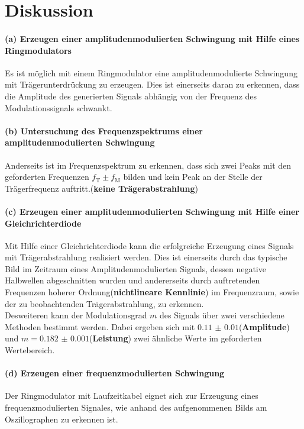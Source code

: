\FloatBarrier
\section{Diskussion}
\label{sec:Diskussion}


\paragraph{(a) Erzeugen einer amplitudenmodulierten Schwingung mit
Hilfe eines Ringmodulators}
Es ist möglich mit einem Ringmodulator
eine amplitudenmodulierte Schwingung
mit Trägerunterdrückung zu erzeugen.
Dies ist einerseits daran zu erkennen,
dass die Amplitude des generierten Signals abhängig
von der Frequenz des Modulationssignals schwankt.

\paragraph{(b) Untersuchung des Frequenzspektrums einer
amplitudenmodulierten Schwingung}
Anderseits ist im Frequenzspektrum zu erkennen, dass sich zwei
Peaks mit den geforderten Frequenzen $f_{\text{T}}\pm f_{\text{M}}$
bilden
und kein Peak an der Stelle der Trägerfrequenz
auftritt.(\textbf{keine Trägerabstrahlung})

\paragraph{(c) Erzeugen einer amplitudenmodulierten Schwingung
mit Hilfe einer Gleichrichterdiode}
Mit Hilfe einer Gleichrichterdiode kann
die erfolgreiche Erzeugung eines Signals mit Trägerabstrahlung
realisiert werden.
Dies ist einerseits durch das typische Bild im Zeitraum eines
Amplitudenmodulierten Signals, dessen negative Halbwellen
abgeschnitten wurden
und andererseits durch auftretenden Frequenzen hoherer
Ordnung(\textbf{nichtlineare Kennlinie})
im Frequenzraum, sowie der zu beobachtenden
Trägerabstrahlung, zu erkennen. \\
Desweiteren kann der Modulationsgrad $m$ des Signals
über zwei verschiedene
Methoden bestimmt werden. Dabei ergeben sich mit
$\num{0.11(1)}$(\textbf{Amplitude}) und $m=\num{0.182(1)}$(\textbf{Leistung})
zwei ähnliche Werte
im geforderten Wertebereich.

\paragraph{(d) Erzeugen einer frequenzmodulierten Schwingung}
Der Ringmodulator mit Laufzeitkabel eignet sich zur Erzeugung
eines frequenzmodulierten Signales, wie anhand des aufgenommenen Bilds
am Oszillographen zu erkennen ist.

